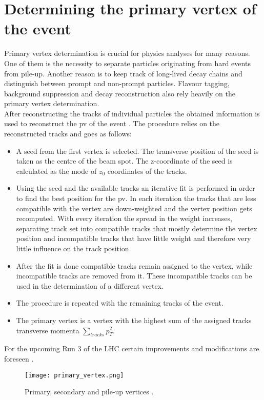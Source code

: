   \section{Determining the primary vertex of the event}
   Primary vertex determination is crucial for physics analyses for many  reasons. One of them is the necessity to separate particles originating from hard events from pile-up. Another reason is to keep track of long-lived decay chains and distinguish between prompt and non-prompt particles. Flavour tagging, background suppression and decay reconstruction also rely heavily on the primary vertex determination.\\
  After reconstructing the tracks of individual particles the obtained information is used to reconstruct the \gls{pv} of the event \cite{PrimVertRun12}. The procedure relies on the reconstructed tracks and goes as follows:
  \begin{itemize}
  \item A seed from the first vertex is selected. The transverse position of the seed is taken as the centre of the beam spot. The z-coordinate of the seed is calculated as the mode of $z_0$ coordinates of the tracks.
  \item Using the seed and the available tracks an iterative fit is performed in order to find the best position for the \gls{pv}. In each iteration the tracks that are less compatible with the vertex are down-weighted and the vertex position gets recomputed. With every iteration the spread in the weight increases, separating track set into compatible tracks that mostly determine the vertex position and incompatible tracks that have little weight and therefore very little influence on the track position. 
  \item After the fit is done compatible tracks remain assigned to the vertex, while incompatible tracks are removed from it. These incompatible tracks can be used in the determination of a different vertex.
  \item The procedure is repeated with the remaining tracks of the event. 
  \item The primary vertex is a vertex with the highest sum of the assigned tracks transverse momenta $\sum_{tracks}p_T^{2}$.
  \end{itemize}  
  For the upcoming Run 3 of the LHC certain improvements and modifications are foreseen \cite{PrimVertRun3}.
  \begin{figure}[htbp]
  	\centering
  	\texttt{[image: primary\_vertex.png]}
  	\caption[Vertices]{Primary, secondary and pile-up vertices \cite{vert_recon}.}
  	\label{fig::pv}
  \end{figure}
